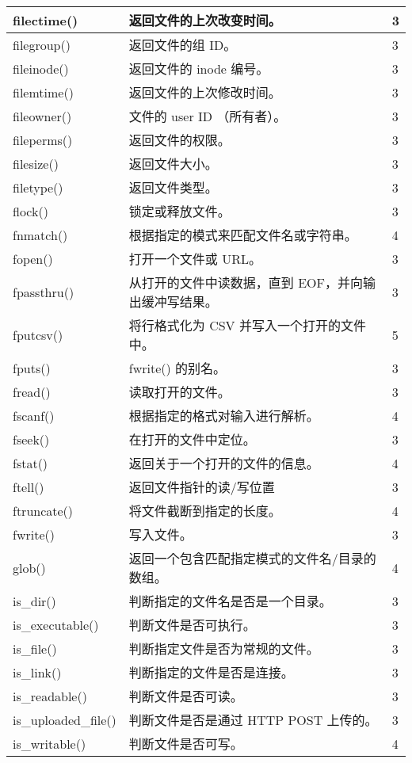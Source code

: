 \begin{longtable}{|m{120pt}|m{250pt}|m{20pt}|}
\hline
filectime()	&返回文件的上次改变时间。	&3\\
\hline
filegroup()	&返回文件的组 ID。	&3\\
\hline
fileinode()	&返回文件的 inode 编号。	&3\\
\hline
filemtime()	&返回文件的上次修改时间。	&3\\
\hline
fileowner()	&文件的 user ID （所有者）。&	3\\
\hline
fileperms()	&返回文件的权限。	&3\\
\hline
filesize()	&返回文件大小。	&3\\
\hline
filetype()	&返回文件类型。	&3\\
\hline
flock()	&锁定或释放文件。	&3\\
\hline
fnmatch()	&根据指定的模式来匹配文件名或字符串。	&4\\
\hline
fopen()	&打开一个文件或 URL。	&3\\
\hline
fpassthru()&	从打开的文件中读数据，直到 EOF，并向输出缓冲写结果。	&3\\
\hline
fputcsv()	&将行格式化为 CSV 并写入一个打开的文件中。	&5\\
\hline
fputs()	&fwrite() 的别名。	&3\\
\hline
fread()	&读取打开的文件。	&3\\
\hline
fscanf()	&根据指定的格式对输入进行解析。	&4\\
\hline
fseek()	&在打开的文件中定位。	&3\\
\hline
fstat()	&返回关于一个打开的文件的信息。	&4\\
\hline
ftell()	&返回文件指针的读/写位置	&3\\
\hline
ftruncate()	&将文件截断到指定的长度。&	4\\
\hline
fwrite()	&写入文件。	&3\\
\hline
glob()	&返回一个包含匹配指定模式的文件名/目录的数组。	&4\\
\hline
is\_dir()	&判断指定的文件名是否是一个目录。	&3\\
\hline
is\_executable()	&判断文件是否可执行。	&3\\
\hline
is\_file()	&判断指定文件是否为常规的文件。&	3\\
\hline
is\_link()	&判断指定的文件是否是连接。&	3\\
\hline
is\_readable()	&判断文件是否可读。	&3\\
\hline
is\_uploaded\_file()	&判断文件是否是通过 HTTP POST 上传的。	&3\\
\hline
is\_writable()	&判断文件是否可写。	&4\\

\end{longtable}
